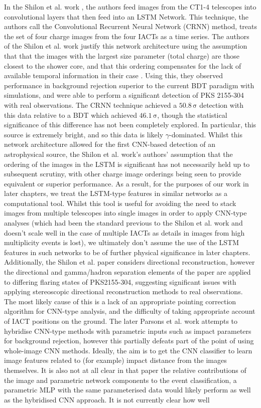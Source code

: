 In the Shilon et al. work \cite{Shilon}, the authors feed images from the CT1-4 telescopes into convolutional layers that then feed into an LSTM Network. This technique, the authors call the Convolutional Recurrent Neural Network (CRNN) method, treats the set of four charge images from the four IACTs as a time series. The authors of the Shilon et al. work justify this network architecture using the assumption that that the images with the largest size parameter (total charge) are those closest to the shower core, and that this ordering compensates for the lack of available temporal information in their case \cite{Shilon}. Using this, they observed performance in background rejection superior to the current BDT paradigm with simulations, and were able to perform a significant detection of PKS 2155-304 with real observations. The CRNN technique achieved a $\mathrm{50.8\,\sigma}$ detection with this data relative to a BDT which achieved $\mathrm{46.1\,\sigma}$, though the statistical significance of this difference has not been completely explored. In particular, this source is extremely bright, and so this data is likely $\gamma$-dominated. Whilst this network architecture allowed for the first CNN-based detection of an astrophysical source, the Shilon et al. work's authors' assumption that the ordering of the images in the LSTM is significant has not necessarily held up to subsequent scrutiny, with other charge image orderings \cite{ariconf} being seen to provide equivalent or superior performance. As a result, for the purposes of our work in later chapters, we treat the LSTM-type features in similar networks as a computational tool. Whilst this tool is useful for avoiding the need to stack images from multiple telescopes into single images in order to apply CNN-type analyses (which had been the standard previous to the Shilon et al. work and doesn't scale well in the case of multiple IACTs \cite{Shilon} \cite{salvatore} as details in images from high multiplicity events is lost), we ultimately don't assume the use of the LSTM features in such networks to be of further physical significance in later chapters. Additionally, the Shilon et al. paper considers directional reconstruction, however the directional and gamma/hadron separation elements of the paper are applied to differing flaring states of PKS2155-304, suggesting significant issues with applying stereoscopic directional reconstruction methods to real observations. The most likely cause of this is a lack of an appropriate pointing correction algorithm for CNN-type analysis, and the difficulty of taking appropriate account of IACT positions on the ground. The later Parsons et al. \cite{ParsonsOhm} work attempts to hybridise CNN-type methods with parametric inputs such as impact parameters for background rejection, however this partially defeats part of the point of using whole-image CNN methods. Ideally, the aim is to get the CNN classifier to learn image features related to (for example) impact distance from the images themselves. It is also not at all clear in that paper the relative contributions of the image and parametric network components to the event classification, a parametric MLP with the same parameterised data would likely perform as well as the hybridised CNN approach. It is not currently clear how well 